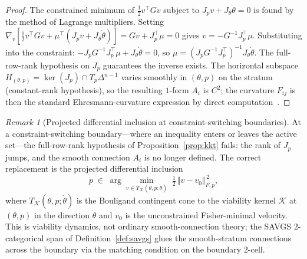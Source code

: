 \documentclass[11pt,a4paper]{article}
\theoremstyle{plain}
\theoremstyle{definition}
\theoremstyle{remark}
\newtheorem{remark}[theorem]{Remark}
\begin{document}
\begin{proof}
The constrained minimum of $\tfrac12 v^\top G v$ subject to
$J_p v + J_\theta\dot\theta = 0$ is found by the method of Lagrange
multipliers. Setting $\nabla_v[\tfrac12 v^\top G v + \mu^\top
(J_p v + J_\theta\dot\theta)] = G v + J_p^\top\mu = 0$ gives
$v = -G^{-1} J_p^\top\mu$. Substituting into the constraint:
$-J_p G^{-1} J_p^\top\mu + J_\theta\dot\theta = 0$, so
$\mu = (J_p G^{-1} J_p^\top)^{-1} J_\theta\dot\theta$. The full-row-rank
hypothesis on $J_p$ guarantees the inverse exists. The horizontal
subspace $H_{(\theta,p)} = \ker(J_p) \cap T_p\Delta^{n-1}$ varies
smoothly in $(\theta, p)$ on the stratum (constant-rank hypothesis),
so the resulting $1$-form $A_i$ is $C^2$; the curvature $F_{ij}$ is
then the standard Ehresmann-curvature expression by direct
computation~\cite{kobayashinomizu1969}.
\end{proof}

\begin{remark}[Projected differential inclusion at constraint-switching
boundaries]\label{rem:pdi}
At a constraint-switching boundary---where an inequality enters or
leaves the active set---the full-row-rank hypothesis of
Proposition~\ref{prop:kkt} fails: the rank of $J_p$ jumps, and the
smooth connection $A_i$ is no longer defined. The correct replacement
is the projected differential inclusion
\begin{equation}\label{eq:pdi}
  \dot p \;\in\; \arg\min_{v \in T_{\!\mathcal K}(\theta, p;\dot\theta)}\;
  \tfrac12\,\bigl\Vert v - v_0 \bigr\Vert_{\!F,p}^{\,2},
\end{equation}
where $T_{\!\mathcal K}(\theta, p;\dot\theta)$ is the Bouligand
contingent cone to the viability kernel $\mathcal K$ at $(\theta, p)$
in the direction $\dot\theta$ and $v_0$ is the unconstrained
Fisher-minimal velocity. This is viability dynamics, not ordinary
smooth-connection theory; the SAVGS $2$-categorical span of
Definition~\ref{def:savgs} glues the smooth-stratum connections across
the boundary via the matching condition on the boundary $2$-cell.
\end{remark}
\end{document}
